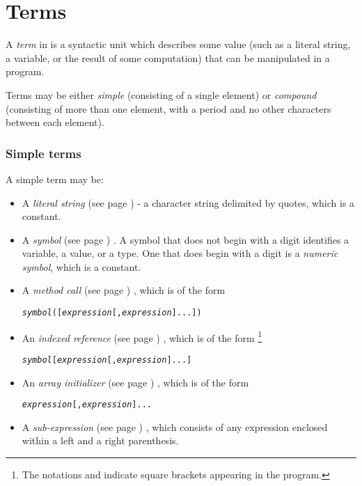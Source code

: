 \chapter{Terms}\label{refterms}
 
A \emph{term} in \nr{} is a syntactic unit which describes some
value (such as a literal string, a variable, or the result of some
computation) that can be manipulated in a \nr{} program.
 
Terms may be either \emph{simple} (consisting of a single element) or
\emph{compound} (consisting of more than one element, with a period
and no other characters between each element).
\subsection{Simple terms}\label{refsimterm}
 A simple term may be:
\begin{itemize}
\item A  \emph{literal string} (see page \pageref{refxstr})  - a character string
delimited by quotes, which is a constant.
\item A  \emph{symbol} (see page \pageref{refsyms}) .
A symbol that does not begin with a digit identifies a variable, a
value, or a type.
One that does begin with a digit is a \emph{numeric symbol}, which is
a constant.
\item A  \emph{method call} (see page \pageref{refmethcon}) , which is of the form
\begin{alltt}
\emph{symbol}([\emph{expression}[,\emph{expression}]...])
\end{alltt}
\item An  \emph{indexed reference} (see page \pageref{refinstr}) , which is of the form
\footnote{
The notations \keyword{'['} and \keyword{']'}
indicate square brackets appearing in the \nr{} program.
}
\begin{alltt}
\emph{symbol}\keyword{'['}[\emph{expression}[,\emph{expression}]...]\keyword{']'}
\end{alltt}
\item An  \emph{array initializer} (see page \pageref{refarrin}) , which is of the form
\begin{alltt}
\keyword{'['}\emph{expression}[,\emph{expression}]...\keyword{']'}
\end{alltt}
\item A  \emph{sub-expression} (see page \pageref{refpreced}) , which consists of any
expression enclosed within a left and a right parenthesis.
\end{itemize}

